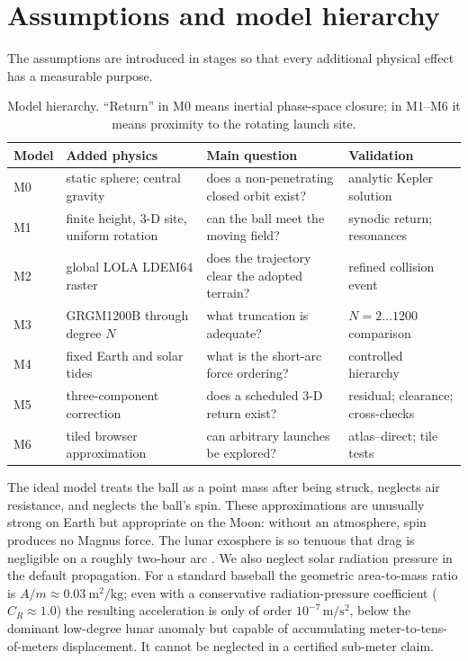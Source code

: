 \section{Assumptions and model hierarchy}

The assumptions are introduced in stages so that every additional physical effect has a measurable purpose.

\begin{table}[tbp]
\caption{Model hierarchy. ``Return'' in M0 means inertial phase-space closure; in M1--M6 it means proximity to the rotating launch site.}
\label{tab:models}
\footnotesize
\begin{ruledtabular}
\begin{tabular}{llll}
Model & Added physics & Main question & Validation \\
\hline
M0 & \parbox[t]{0.22\textwidth}{static sphere; central gravity} & \parbox[t]{0.25\textwidth}{does a non-penetrating closed orbit exist?} & analytic Kepler solution \\
M1 & \parbox[t]{0.22\textwidth}{finite height, 3-D site, uniform rotation} & \parbox[t]{0.25\textwidth}{can the ball meet the moving field?} & synodic return; resonances \\
M2 & global LOLA LDEM64 raster & \parbox[t]{0.25\textwidth}{does the trajectory clear the adopted terrain?} & refined collision event \\
M3 & GRGM1200B through degree $N$ & \parbox[t]{0.25\textwidth}{what truncation is adequate?} & $N=2\ldots1200$ comparison \\
M4 & fixed Earth and solar tides & \parbox[t]{0.25\textwidth}{what is the short-arc force ordering?} & controlled hierarchy \\
M5 & three-component correction & \parbox[t]{0.25\textwidth}{does a scheduled 3-D return exist?} & residual; clearance; cross-checks \\
M6 & tiled browser approximation & \parbox[t]{0.25\textwidth}{can arbitrary launches be explored?} & atlas--direct; tile tests
\end{tabular}
\end{ruledtabular}
\end{table}

The ideal model treats the ball as a point mass after being struck, neglects air resistance, and neglects the ball's spin. These approximations are unusually strong on Earth but appropriate on the Moon: without an atmosphere, spin produces no Magnus force. The lunar exosphere is so tenuous that drag is negligible on a roughly two-hour arc \cite{NASALunarAtmosphere}. We also neglect solar radiation pressure in the default propagation. For a standard baseball the geometric area-to-mass ratio is $A/m\approx\SI{0.03}{\metre^2\per\kilogram}$; even with a conservative radiation-pressure coefficient ($C_R\approx 1.0$) the resulting acceleration is only of order $10^{-7}\,\si{\metre\per\square\second}$, below the dominant low-degree lunar anomaly but capable of accumulating meter-to-tens-of-meters displacement. It cannot be neglected in a certified sub-meter claim.

